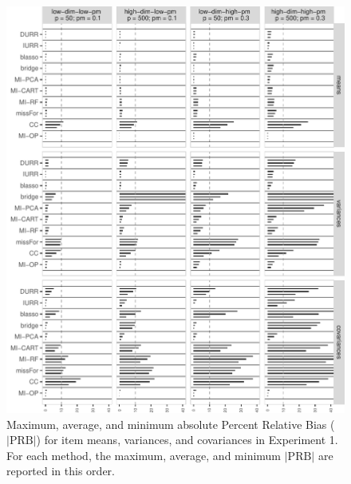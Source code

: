 \begin{figure}
\centering
\includegraphics{../../output/graphs/exp1_bias_summy.pdf}
\caption{\label{fig:exp1bias}
	Maximum, average, and minimum absolute Percent Relative Bias ($|\text{PRB}|$) for item means, variances, 
	and covariances in Experiment 1.
	For each method, the maximum, average, and minimum $|\text{PRB}|$ are reported in this order.
	}
\end{figure}

